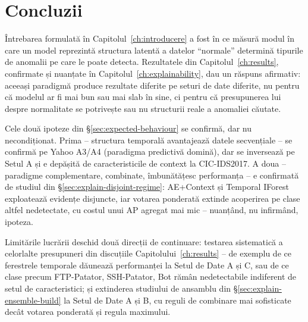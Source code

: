 \chapter{Concluzii}
\label{ch:concluzii}

Întrebarea formulată în Capitolul~\ref{ch:introducere} a fost în ce măsură modul în care un model reprezintă structura latentă a datelor \enquote{normale} determină tipurile de anomalii pe care le poate detecta. Rezultatele din Capitolul~\ref{ch:results}, confirmate și nuanțate în Capitolul~\ref{ch:explainability}, dau un răspuns afirmativ: aceeași paradigmă produce rezultate diferite pe seturi de date diferite, nu pentru că modelul ar fi mai bun sau mai slab în sine, ci pentru că presupunerea lui despre normalitate se potrivește sau nu structurii reale a anomaliei căutate.

Cele două ipoteze din \S\ref{sec:expected-behaviour} se confirmă, dar nu necondiționat. Prima -- structura temporală avantajează datele secvențiale -- se confirmă pe Yahoo A3/A4 (paradigma predictivă domină), dar se inversează pe Setul A și e depășită de caracteristicile de context la CIC-IDS2017. A doua -- paradigme complementare, combinate, îmbunătățesc performanța -- e confirmată de studiul din \S\ref{sec:explain-disjoint-regime}: AE+Context și Temporal IForest exploatează evidențe disjuncte, iar votarea ponderată extinde acoperirea pe clase altfel nedetectate, cu costul unui AP agregat mai mic -- nuanțând, nu infirmând, ipoteza.

Limitările lucrării deschid două direcții de continuare: testarea sistematică a celorlalte presupuneri din discuțiile Capitolului~\ref{ch:results} -- de exemplu de ce ferestrele temporale dăunează performanței la Setul de Date A și C, sau de ce clase precum FTP-Patator, SSH-Patator, Bot rămân nedetectabile indiferent de setul de caracteristici; și extinderea studiului de ansamblu din \S\ref{sec:explain-ensemble-build} la Setul de Date A și B, cu reguli de combinare mai sofisticate decât votarea ponderată și regula maximului.

\enlargethispage{\baselineskip}